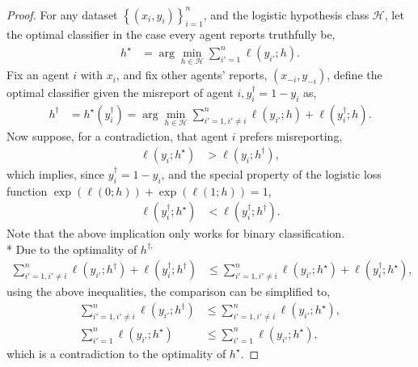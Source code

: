\documentclass{article}
\begin{document}
\begin{proof} \label{proof:binpf} 
For any dataset $\left\{\left(x_{i}, y_{i}\right)\right\}_{i=1}^{n}$, and the logistic hypothesis class $\mathcal{H}$, let the optimal classifier in the case every agent reports truthfully be,
\begin{align*}
h^\star  &= \arg\displaystyle\min_{h \in \mathcal{H}} \displaystyle\sum_{i'=1}^{n} \ell\left(y_{i'}; h\right).
\end{align*}
Fix an agent $i $ with $x_{i}$, and fix other agents' reports, $\left(x_{-i}, y_{-i}\right)$, define the optimal classifier given the misreport of agent $i , y^{\dagger}_{i} = 1 - y_{i}$ as,
\begin{align*}
h^{\dagger} &= h^\star \left(y^{\dagger}_{i}\right) = \arg\displaystyle\min_{h \in \mathcal{H}} \displaystyle\sum_{i'=1, i' \neq  i}^{n} \ell\left(y_{i'} ; h\right) + \ell\left(y^{\dagger}_{i} ; h\right).
\end{align*}
Now suppose, for a contradiction, that agent $i $ prefers misreporting,
\begin{align*}
\ell\left(y_{i} ; h^\star \right) &> \ell\left(y_{i} ; h^{\dagger}\right),
\end{align*}
which implies, since $y^{\dagger}_{i} = 1 - y_{i}$, and the special property of the logistic loss function $\exp\left(\ell\left(0 ; h\right)\right) + \exp\left(\ell\left(1 ; h\right)\right) = 1$,
\begin{align*}
\ell\left(y^{\dagger}_{i} ; h^\star \right) &< \ell\left(y^{\dagger}_{i} ; h^{\dagger}\right).
\end{align*}
Note that the above implication only works for binary classification.
\\* Due to the optimality of $h^{\dagger,}$
\begin{align*}
\displaystyle\sum_{i'=1, i' \neq  i}^{n} \ell\left(y_{i'} ; h^{\dagger}\right) + \ell\left(y^{\dagger}_{i} ; h^{\dagger}\right) &\leq  \displaystyle\sum_{i'=1, i' \neq  i}^{n} \ell\left(y_{i'} ; h^\star \right) + \ell\left(y^{\dagger}_{i} ; h^\star \right),
\end{align*}
using the above inequalities, the comparison can be simplified to,
\begin{align*}
\displaystyle\sum_{i'=1, i' \neq  i}^{n} \ell\left(y_{i'} ; h^{\dagger}\right) &\leq  \displaystyle\sum_{i'=1, i' \neq  i}^{n} \ell\left(y_{i'} ; h^\star \right),
\\ \displaystyle\sum_{i'=1}^{n} \ell\left(y_{i'} ; h^\star \right) &\leq  \displaystyle\sum_{i'=1}^{n} \ell\left(y_{i'} ; h^\star \right),
\end{align*}
which is a contradiction to the optimality of $h^\star $.
\newline \newline\end{proof}
\end{document}
